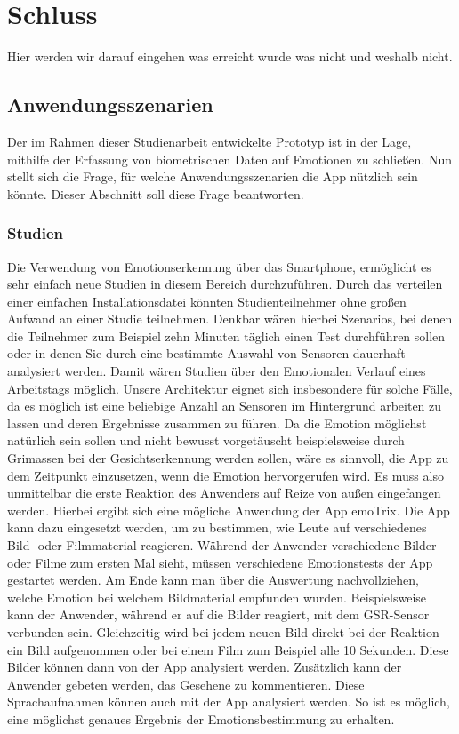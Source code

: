 \section{Schluss}
Hier werden wir darauf eingehen was erreicht wurde was nicht und weshalb nicht.
\subsection{Anwendungsszenarien}
Der im Rahmen dieser Studienarbeit entwickelte Prototyp ist in der Lage, mithilfe der Erfassung von biometrischen Daten auf Emotionen zu schließen. Nun stellt sich die Frage, für welche Anwendungsszenarien die App nützlich sein könnte. Dieser Abschnitt soll diese Frage beantworten. \newline
\subsubsection{Studien}
Die Verwendung von Emotionserkennung über das Smartphone, ermöglicht es sehr einfach neue Studien in diesem Bereich durchzuführen. Durch das verteilen einer einfachen Installationsdatei könnten Studienteilnehmer ohne großen Aufwand an einer Studie teilnehmen. Denkbar wären hierbei Szenarios, bei denen die Teilnehmer zum Beispiel zehn Minuten täglich einen Test durchführen sollen oder in denen Sie durch eine bestimmte Auswahl von Sensoren dauerhaft analysiert werden. Damit wären Studien über den Emotionalen Verlauf eines Arbeitstags möglich.\newline
Unsere Architektur eignet sich insbesondere für solche Fälle, da es möglich ist eine beliebige Anzahl an Sensoren im Hintergrund arbeiten zu lassen und deren Ergebnisse zusammen zu führen. \newline 
Da die Emotion möglichst natürlich sein sollen und nicht bewusst vorgetäuscht beispielsweise durch Grimassen bei der Gesichtserkennung werden sollen, wäre es sinnvoll, die App zu dem Zeitpunkt einzusetzen, wenn die Emotion hervorgerufen wird. Es muss also unmittelbar die erste Reaktion des Anwenders auf Reize von außen eingefangen werden. Hierbei ergibt sich eine mögliche Anwendung der App emoTrix. \newline
Die App kann dazu eingesetzt werden, um zu bestimmen, wie Leute auf verschiedenes Bild- oder Filmmaterial reagieren. Während der Anwender verschiedene Bilder oder Filme zum ersten Mal sieht, müssen verschiedene Emotionstests der App gestartet werden. Am Ende kann man über die Auswertung nachvollziehen, welche Emotion bei welchem Bildmaterial empfunden wurden. Beispielsweise kann der Anwender, während er auf die Bilder reagiert, mit dem GSR-Sensor verbunden sein. Gleichzeitig wird bei jedem neuen Bild direkt bei der Reaktion ein Bild aufgenommen oder bei einem Film zum Beispiel alle 10 Sekunden. Diese Bilder können dann von der App analysiert werden. Zusätzlich kann der Anwender gebeten werden, das Gesehene zu kommentieren. Diese Sprachaufnahmen können auch mit der App analysiert werden. So ist es möglich, eine möglichst genaues Ergebnis der Emotionsbestimmung zu erhalten. \newline
